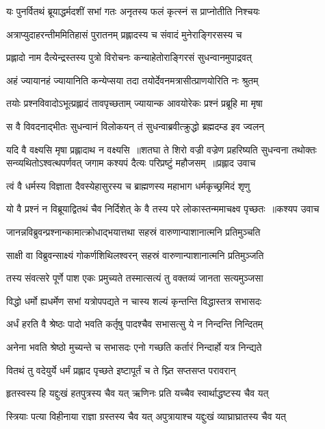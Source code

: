 \twolineshloka
{यः पुनर्वितथं ब्रूयाद्धर्मदशीं सभां गतः}
{अनृतस्य फलं कृत्स्नं स प्राप्नोतीति निश्चयः}


\twolineshloka
{अत्राप्युदाहरन्तीममितिहासं पुरातनम्}
{प्रह्लादस्य च संवादं मुनेराङ्गिरसस्य च}


\twolineshloka
{प्रह्लादो नाम दैत्येन्द्रस्तस्य पुत्रो विरोचनः}
{कन्याहेतोराङ्गिरसं सुधन्वानमुपाद्रवत्}


\twolineshloka
{अहं ज्यायानहं ज्यायानिति कन्येप्सया तदा}
{तयोर्देवनमत्रासीत्प्राणयोरिति नः श्रुतम्}


\twolineshloka
{तयोः प्रश्नविवादोऽभूत्प्रह्लादं तावपृच्छताम्}
{ज्यायान्क आवयोरेकः प्रश्नं प्रब्रूहि मा मृषा}


\twolineshloka
{स वै विवदनाद्भीतः सुधन्वानं विलोकयन्}
{तं सुधन्वाब्रवीत्क्रुद्धो ब्रह्मदम्ड इव ज्वलन्}


यदि वै वक्ष्यसि मृषा प्रह्लादाथ न वक्ष्यसि ॥शतघा ते शिरो वज्री वज्रेण प्रहरिष्यति
\twolineshloka
{सुधन्वना तथोक्तः सन्व्यथितोऽश्वत्थपर्णवत्}
{जगाम कश्यपं दैत्यः परिप्रष्टुं महौजसम् ॥प्रह्लाद उवाच}


\twolineshloka
{त्वं वै धर्मस्य विज्ञाता दैवस्येहासुरस्य च}
{ब्राह्मणस्य महाभाग धर्मकृच्छ्रमिदं शृणु}


\twolineshloka
{यो वै प्रश्नं न विब्रूयाद्वितथं चैव निर्दिशेत्}
{के वै तस्य परे लोकास्तन्ममाचक्ष्व पृच्छतः ॥कश्यप उवाच}


\twolineshloka
{जानन्नविब्रुवन्प्रश्नान्कामात्क्रोधाद्भयात्तथा}
{सहस्रं वारुणान्पाशानात्मनि प्रतिमुञ्चति}


\twolineshloka
{साक्षी वा विब्रुवन्साक्ष्यं गोकर्णशिथिलश्वरन्}
{सहस्रं वारुणान्पाशानात्मनि प्रतिमुञ्जति}


\twolineshloka
{तस्य संवत्सरे पूर्णे पाश एकः प्रमुच्यते}
{तस्मात्सत्यं तु वक्तव्यं जानता सत्यमुञ्जसा}


\twolineshloka
{विद्धो धर्मो ह्यधर्मेण सभां यत्रोपपद्यते}
{न चास्य शल्यं कृन्तन्ति विद्धास्तत्र सभासदः}


\twolineshloka
{अर्धं हरति वै श्रेष्ठः पादो भवति कर्तृषु}
{पादश्चैव सभासत्सु ये न निन्दन्ति निन्दितम्}


\twolineshloka
{अनेना भवति श्रेष्ठो मुच्यन्ते च सभासदः}
{एनो गच्छति कर्तारं निन्दार्हो यत्र निन्द्यते}


\twolineshloka
{वितथं तु वदेयुर्ये धर्मं प्रह्लाद पृच्छते}
{इष्टापूर्तं च ते घ्न्ति सप्तसप्त परावरान्}


\twolineshloka
{हृतस्वस्य हि यद्दुःखं हतपुत्रस्य चैव यत्}
{ऋणिनः प्रति यच्चैव स्वार्थाद्धष्टस्य चैव यत्}


\twolineshloka
{स्त्रियाः पत्या विहीनाया राज्ञा ग्रस्तस्य चैव यत्}
{अपुत्रायाश्च यद्दुःखं व्याघ्राघ्रातस्य चैव यत्}


